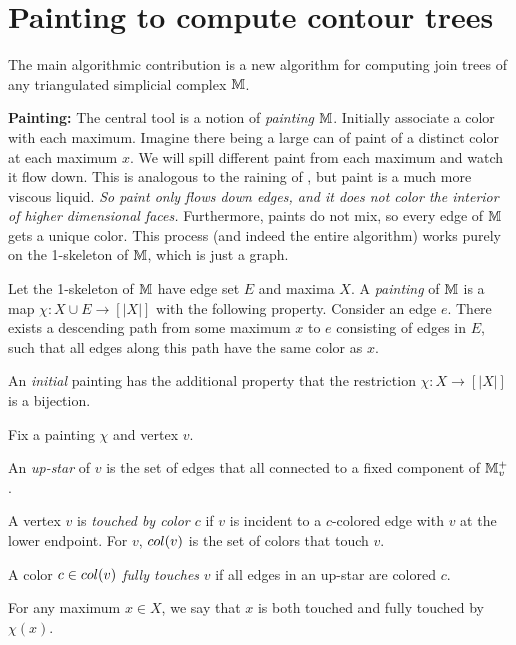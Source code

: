 \section{Painting to compute contour trees}
\label{sec:paint}

The main algorithmic contribution is a new algorithm for computing join trees of any triangulated simplicial
complex $\mathbb{M}$.


{\bf Painting:} The central tool is a notion 
of \emph{painting} $\mathbb{M}$. Initially associate a color with each maximum. Imagine there being a large
can of paint of a distinct color at each maximum $x$. We will spill different paint from each maximum and watch it flow down.
This is analogous to the raining of , but paint is a much more viscous liquid.
\emph{So paint only flows down edges, and it does not color the interior of higher dimensional faces.} Furthermore, paints
do not mix, so every edge of $\mathbb{M}$ gets a unique color. This process (and indeed the entire algorithm)
works purely on the 1-skeleton of $\mathbb{M}$, which is just a graph.
%


\begin{definition} \label{def:paint2} Let the 1-skeleton of $\mathbb{M}$ have edge set $E$ and maxima $X$.
A  \emph{painting} of $\mathbb{M}$ is a map $\chi:X \cup E \to [|X|]$ with the following property. 
 Consider an edge $e$. There exists a descending path from some maximum $x$ to $e$
	consisting of edges in $E$, such that all edges along this path have the same color as $x$. 

An \emph{initial} painting has the additional property that the restriction $\chi:X \to [|X|]$ is a bijection.
\end{definition}


\begin{definition} \label{def:color-set} Fix a painting $\chi$ and vertex $v$.
\begin{asparaitem}
	 \item An \emph{up-star} of $v$ is the set of edges that all connected to a fixed component of $\mathbb{M}^+_v$.
	 \item A vertex $v$ is \emph{touched by color $c$} if $v$ is incident to a $c$-colored
	 edge with $v$ at the lower endpoint. For $v$, $col(v)$ is the set of colors that touch $v$.
	 \item A color $c \in col(v)$ \emph{fully touches} $v$ if all edges in an up-star are colored $c$.
	 \item For any maximum $x\in X$, we say that $x$ is both touched and fully touched by $\chi(x)$.
\end{asparaitem}
\end{definition}

